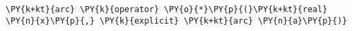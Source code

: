 \begin{Verbatim}[commandchars=\\\{\}]
    \PY{k+kt}{arc} \PY{k}{operator} \PY{o}{*}\PY{p}{(}\PY{k+kt}{real} \PY{n}{x}\PY{p}{,} \PY{k}{explicit} \PY{k+kt}{arc} \PY{n}{a}\PY{p}{)}
\end{Verbatim}
